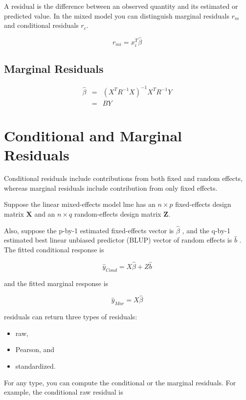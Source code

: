 \documentclass[Main.tex]{subfiles}
\begin{document}
\begin{itemize}
A residual is the difference between an observed quantity and its estimated or predicted value. In the mixed
model you can distinguish marginal residuals $r_m$ and conditional residuals $r_c$. 

\begin{equation}
r_{mi}=x^{T}_{i}\hat{\beta}
\end{equation}

\subsection{Marginal Residuals}
\begin{eqnarray}
	\hat{\beta} &=& (X^{T}R^{-1}X)^{-1}X^{T}R^{-1}Y \nonumber \\
&=& BY \nonumber
\end{eqnarray}
		


	
	
\section{Conditional and Marginal Residuals}
Conditional residuals include contributions from both fixed and random effects, whereas marginal residuals include contribution from only fixed effects.

Suppose the linear mixed-effects model lme has an $n \times p$ fixed-effects design matrix $\boldsymbol{X}$ and an $n \times q$ random-effects design matrix $\boldsymbol{Z}$. 

Also, suppose the p-by-1 estimated fixed-effects vector is $\hat{\beta}$ , and the q-by-1 estimated best linear unbiased predictor (BLUP) 
vector of random effects is $\hat{b}$ . The fitted conditional response is

\[ \hat{y}_{Cond} = X \hat{\beta} + Z \hat{b} \]

and the fitted marginal response is


\[ \hat{y}_{Mar} = X \hat{\beta} \]

residuals can return three types of residuals:
\begin{itemize} 
\item raw, 
\item Pearson, and 
\item standardized.\end{itemize} For any type, you can compute the conditional or the marginal residuals. For example, the conditional raw residual is



\end{itemize}
\end{document}
